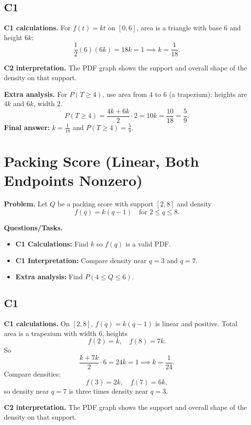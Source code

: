 	\subsection*{C1}

\textbf{C1 calculations.}
For $f(t)=kt$ on $[0,6]$, area is a triangle with base $6$ and height $6k$:
	\[
	\frac12(6)(6k)=18k=1\implies k=\frac1{18}.
	\]

\textbf{C2 interpretation.}
The PDF graph shows the support and overall shape of the density on that support.

\textbf{Extra analysis.}
For $P(T\ge4)$, use area from $4$ to $6$ (a trapezium): heights are $4k$ and $6k$, width $2$.
\[
P(T\ge4)=\frac{4k+6k}{2}\cdot2=10k=\frac{10}{18}=\frac59.
\]
\textbf{Final answer:} $k=\frac1{18}$ and $P(T\ge4)=\frac59$.
	\section{Packing Score (Linear, Both Endpoints Nonzero)}
	
	\textbf{Problem.}
	Let $Q$ be a packing score with support $[2,8]$ and density
	\[
	f(q)=k(q-1)\quad\text{for }2\le q\le 8.
	\]
	
	\textbf{Questions/Tasks.}
	\begin{itemize}
		\item \textbf{C1 Calculations:} Find $k$ so $f(q)$ is a valid PDF.
		\item \textbf{C1 Interpretation:} Compare density near $q=3$ and $q=7$.
		\item \textbf{Extra analysis:} Find $P(4\le Q\le 6)$.
	\end{itemize}

	\subsection*{C1}

\textbf{C1 calculations.}
On $[2,8]$, $f(q)=k(q-1)$ is linear and positive. Total area is a trapezium with width $6$, heights
	\[
	f(2)=k,\quad f(8)=7k.
	\]
	So
	\[
	\frac{k+7k}{2}\cdot6=24k=1\implies k=\frac1{24}.
	\]
	Compare densities:
	\[
	f(3)=2k,\quad f(7)=6k,
	\]
	so density near $q=7$ is three times density near $q=3$.

\textbf{C2 interpretation.}
The PDF graph shows the support and overall shape of the density on that support.

